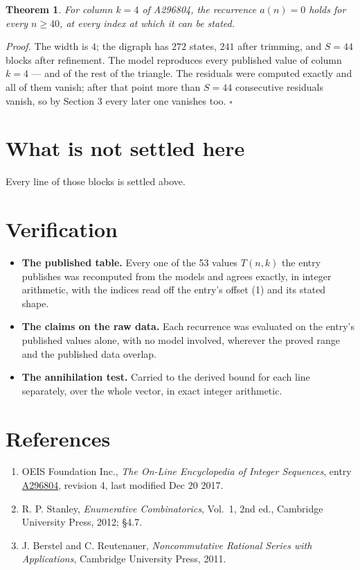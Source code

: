 \documentclass[11pt]{article}
\newtheorem{theorem}{Theorem}
\theoremstyle{definition}
\begin{document}
\begin{theorem} For column $k = 4$ of A296804, the recurrence $a(n) = 0$ holds for every $n \ge 40$, at every index at which it can be stated.\end{theorem}

{\itshape Proof.} The width is $4$; the digraph has $272$ states, $241$ after trimming, and $S = 44$ blocks after refinement. The model reproduces every published value of column $k = 4$ --- and of the rest of the triangle. The residuals were computed exactly and all of them vanish; after that point more than $S = 44$ consecutive residuals vanish, so by Section 3 every later one vanishes too. $\square$

\section{What is not settled here}

Every line of those blocks is settled above.

\section{Verification}

\begin{itemize}

\item {\bfseries The published table.} Every one of the 53 values $T(n,k)$ the entry publishes was recomputed from the models and agrees exactly, in integer arithmetic, with the indices read off the entry's offset (1) and its stated shape.

\item {\bfseries The claims on the raw data.} Each recurrence was evaluated on the entry's published values alone, with no model involved, wherever the proved range and the published data overlap.

\item {\bfseries The annihilation test.} Carried to the derived bound for each line separately, over the whole vector, in exact integer arithmetic.

\end{itemize}

\section{References}

\begin{enumerate}

\item OEIS Foundation Inc., \emph{The On-Line Encyclopedia of Integer Sequences}, entry \href{https://oeis.org/A296804}{A296804}, revision 4, last modified Dec 20 2017.

\item R. P. Stanley, \emph{Enumerative Combinatorics}, Vol.~1, 2nd ed., Cambridge University Press, 2012; \S4.7.

\item J. Berstel and C. Reutenauer, \emph{Noncommutative Rational Series with Applications}, Cambridge University Press, 2011.

\end{enumerate}
\end{document}
